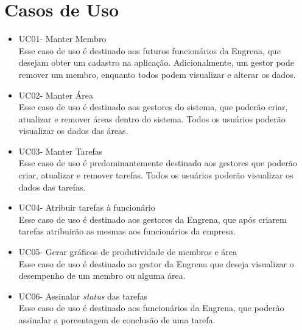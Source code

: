 \section{Casos de Uso}
\begin{itemize}
\item UC01- Manter Membro \\
  Esse caso de uso é destinado aos futuros funcionários da Engrena, que desejam obter um cadastro na aplicação. Adicionalmente, um gestor pode remover um membro, enquanto todos podem visualizar e alterar os dados.
\item UC02- Manter Área \\
  Esse caso de uso é destinado aos gestores do sistema, que poderão criar, atualizar e remover áreas dentro do sistema. Todos os usuários poderão visualizar os dados das áreas.
\item UC03- Manter Tarefas \\
  Esse caso de uso é predominantemente destinado aos gestores que poderão criar, atualizar e remover tarefas. Todos os usuários poderão visualizar os dados das tarefas.

\item UC04- Atribuir tarefas à funcionário \\
  Esse caso de uso é destinado aos gestores da Engrena, que após criarem tarefas atribuirão as mesmas aos funcionários da empresa.
\item UC05- Gerar gráficos de produtividade de membros e área \\
  Esse caso de uso é destinado ao gestor da Engrena que deseja visualizar o desempenho de um membro ou alguma área.
\item UC06- Assinalar \textit{status} das tarefas \\
  Esse caso de uso é destinado aos funcionários da Engrena, que poderão assinalar a porcentagem de conclusão de uma tarefa.
\end{itemize}
